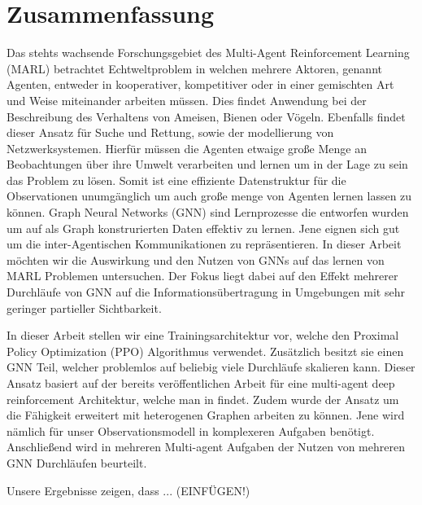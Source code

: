 
\chapter*{Zusammenfassung}

Das stehts wachsende Forschungsgebiet des Multi-Agent Reinforcement Learning (MARL) betrachtet Echtweltproblem in welchen mehrere Aktoren, genannt Agenten, entweder in kooperativer, kompetitiver oder in einer gemischten Art und Weise miteinander arbeiten müssen. Dies findet Anwendung bei der Beschreibung des Verhaltens von Ameisen, Bienen oder Vögeln. Ebenfalls findet dieser Ansatz für Suche und Rettung, sowie der modellierung von Netzwerksystemen. Hierfür müssen die Agenten etwaige große Menge an Beobachtungen über ihre Umwelt verarbeiten und lernen um in der Lage zu sein das Problem zu lösen. Somit ist eine effiziente Datenstruktur für die Observationen unumgänglich um auch große menge von Agenten lernen lassen zu können. 
Graph Neural Networks (GNN) sind Lernprozesse die entworfen wurden um auf als Graph konstrurierten Daten effektiv zu lernen. Jene eignen sich gut um die inter-Agentischen Kommunikationen zu repräsentieren. In dieser Arbeit möchten wir die Auswirkung und den Nutzen von GNNs auf das lernen von MARL Problemen untersuchen. Der Fokus liegt dabei auf den Effekt mehrerer Durchläufe von GNN auf die Informationsübertragung in Umgebungen mit sehr geringer partieller Sichtbarkeit.\par

In dieser Arbeit stellen wir eine Trainingsarchitektur vor, welche den Proximal Policy Optimization (PPO) Algorithmus verwendet. Zusätzlich besitzt sie einen GNN Teil, welcher problemlos auf beliebig viele Durchläufe skalieren kann. Dieser Ansatz basiert auf der bereits veröffentlichen Arbeit für eine multi-agent deep reinforcement Architektur, welche man in \citet{RobinRuede2021} findet. Zudem wurde der Ansatz um die Fähigkeit erweitert mit heterogenen Graphen arbeiten zu können. Jene wird nämlich für unser Observationsmodell in komplexeren Aufgaben benötigt. Anschließend wird in mehreren Multi-agent Aufgaben der Nutzen von mehreren GNN Durchläufen beurteilt.\par

Unsere Ergebnisse zeigen, dass ... (EINFÜGEN!)